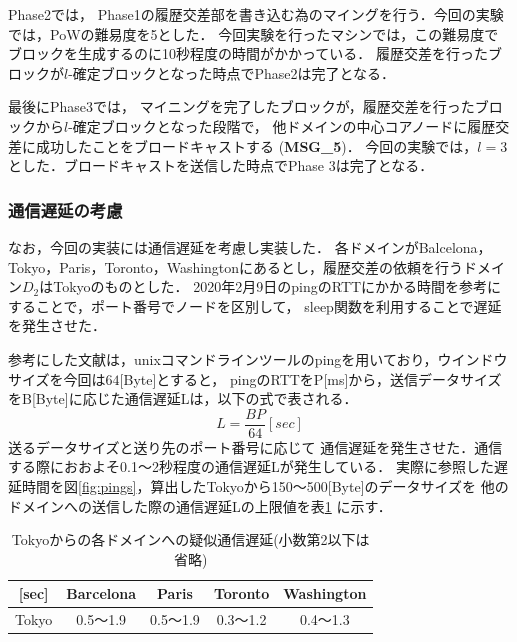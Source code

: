 \documentclass[a4paper,12pt]{jsarticle}
\begin{document}
Phase2では，
Phase1の履歴交差部を書き込む為のマイングを行う．今回の実験では，PoWの難易度を5とした．
今回実験を行ったマシンでは，この難易度でブロックを生成するのに10秒程度の時間がかかっている．
履歴交差を行ったブロックが$l$-確定ブロックとなった時点でPhase2は完了となる．

最後にPhase3では，
マイニングを完了したブロックが，履歴交差を行ったブロックから$l$-確定ブロックとなった段階で，
他ドメインの中心コアノードに履歴交差に成功したことをブロードキャストする
 (\textbf{MSG\_5})．
今回の実験では，$l=3$とした．ブロードキャストを送信した時点でPhase 3は完了となる．



\subsubsection{通信遅延の考慮}

なお，今回の実装には通信遅延を考慮し実装した．
各ドメインがBalcelona，Tokyo，Paris，Toronto，Washingtonにあるとし，履歴交差の依頼を行うドメイン$D_2$はTokyoのものとした．
2020年2月9日のpingのRTTにかかる時間\cite{pings}を参考にすることで，ポート番号でノードを区別して，
sleep関数を利用することで遅延を発生させた．

参考にした文献\cite{pings}は，unixコマンドラインツールのpingを用いており，ウインドウサイズを今回は$64$[Byte]とすると，
pingのRTTをP[ms]から，送信データサイズをB[Byte]に応じた通信遅延Lは，以下の式で表される．
\begin{equation}
  \label{byt}
    L = \frac{BP}{64} [sec]
\end{equation}
送るデータサイズと送り先のポート番号に応じて
通信遅延を発生させた．通信する際におおよそ0.1〜2秒程度の通信遅延Lが発生している．
実際に参照した遅延時間を図\ref{fig:pings}，算出したTokyoから150〜500[Byte]のデータサイズを
他のドメインへの送信した際の通信遅延Lの上限値を表\ref{Byte} に示す．

\begin{table}[H]%
  \centering
  \caption{Tokyoからの各ドメインへの疑似通信遅延(小数第2以下は省略)}
  \label{Byte}
  \begin{tabular}{c|c|c|c|c|}
  \cline{2-5}
  [sec]                       & Barcelona &    Paris   &   Toronto  & Washington \\ \hline
  \multicolumn{1}{|c|}{Tokyo} &  0.5〜1.9 &  0.5〜1.9  &  0.3〜1.2  &  0.4〜1.3  \\ \hline
  \end{tabular}
\end{table}
\end{document}
